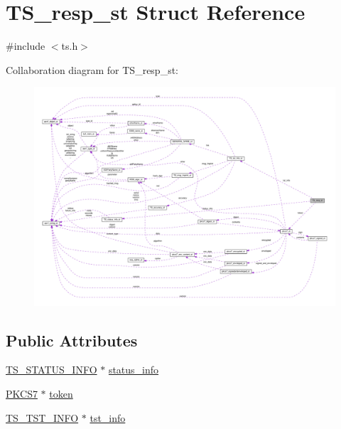 \hypertarget{struct_t_s__resp__st}{}\section{T\+S\+\_\+resp\+\_\+st Struct Reference}
\label{struct_t_s__resp__st}


{\ttfamily \#include $<$ts.\+h$>$}



Collaboration diagram for T\+S\+\_\+resp\+\_\+st\+:
\nopagebreak
\begin{figure}[H]
\begin{center}
\leavevmode
\includegraphics[width=350pt]{struct_t_s__resp__st__coll__graph}
\end{center}
\end{figure}
\subsection*{Public Attributes}
\begin{DoxyCompactItemize}
\item 
\hyperlink{ts_8h_a6f09f73975393a634d74cd34e9072c73}{T\+S\+\_\+\+S\+T\+A\+T\+U\+S\+\_\+\+I\+N\+FO} $\ast$ \hyperlink{struct_t_s__resp__st_a9bd656baceb73a81e2cb3b41799c8dc0}{status\+\_\+info}
\item 
\hyperlink{pkcs7_8h_af773f722a43f0fee6be7bfc1721c5290}{P\+K\+C\+S7} $\ast$ \hyperlink{struct_t_s__resp__st_afaf455ead8fb6b4c236f8c6c28eb458d}{token}
\item 
\hyperlink{ts_8h_a7de94faeeabec73a2241426a20ffa24f}{T\+S\+\_\+\+T\+S\+T\+\_\+\+I\+N\+FO} $\ast$ \hyperlink{struct_t_s__resp__st_a79930775dd736e54ec3b762292e654e6}{tst\+\_\+info}
\end{DoxyCompactItemize}



